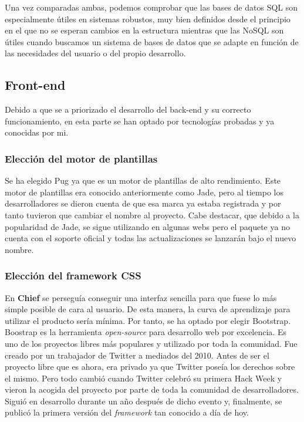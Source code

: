 Una vez comparadas ambas, podemos comprobar que las bases de datos SQL son especialmente útiles en sistemas robustos, muy bien definidos desde el principio
en el que no se esperan cambios en la estructura mientras que las NoSQL son útiles cuando buscamos un sistema de bases de datos que se adapte en función
de las necesidades del usuario o del propio desarrollo.


\subsection{Front-end}

Debido a que se a priorizado el desarrollo del back-end y su correcto funcionamiento, en esta parte se han optado por tecnologías probadas y 
ya conocidas por mi.

\subsubsection{Elección del motor de plantillas}

Se ha elegido Pug\cite{pug} ya que es un motor de plantillas de alto rendimiento. Este motor de plantillas era conocido anteriormente como Jade\cite{jade}, pero al tiempo
los desarrolladores se dieron cuenta de que esa marca ya estaba registrada y por tanto tuvieron que cambiar el nombre al proyecto. Cabe destacar,
que debido a la popularidad de Jade, se sigue utilizando en algunas webs pero el paquete ya no cuenta con el soporte oficial y todas las actualizaciones se lanzarán bajo el nuevo nombre. 

\subsubsection{Elección del framework CSS}

En \textbf{Chief} se perseguía conseguir una interfaz sencilla para que fuese lo más simple posible de cara al usuario. De esta manera, la curva de aprendizaje
para utilizar el producto sería mínima. Por tanto, se ha optado por elegir Bootstrap.\\

Boostrap\cite{bootstrap} es la herramienta \textit{open-source} para desarrollo web por excelencia. Es uno de los proyectos libres más populares y utilizado por toda la comunidad.
Fue creado por un trabajador de Twitter a mediados del 2010. Antes de ser el proyecto libre que es ahora, era privado ya que Twitter poseía los derechos sobre el mismo.
Pero todo cambió cuando Twitter celebró su primera Hack Week\cite{hack-week} y vieron la acogida del proyecto por parte de toda la comunidad de desarrolladores. Siguió en desarrollo
durante un año después de dicho evento y, finalmente, se publicó la primera versión del \textit{framework} tan conocido a día de hoy.\\

